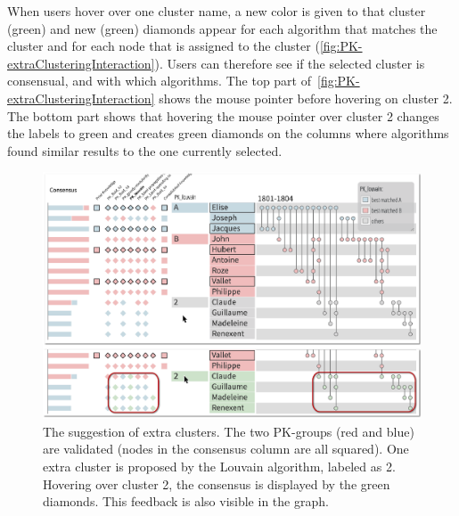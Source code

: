 When users hover over one cluster name, a new color is given to that cluster (\eg green) and new (green) diamonds appear for each algorithm that matches the cluster and for each node that is assigned to the cluster (\autoref{fig:PK-extraClusteringInteraction}).
Users can therefore see if the selected cluster is consensual, and with which algorithms. The top part of~\autoref{fig:PK-extraClusteringInteraction} shows the mouse pointer before hovering on cluster 2. The bottom part shows that hovering the mouse pointer over cluster 2
changes the labels to green and creates green diamonds on the columns where algorithms found similar results to the one currently selected.



\begin{figure}[!ht]
\centering
\includegraphics[width=\linewidth]{static/figures/PK-Clustering/exemple-corrections/Small-extraClusters-01-correct2}
\caption{The suggestion of extra clusters. The two PK-groups (red and blue) are validated (nodes in the consensus column are all squared). One extra cluster is proposed by the Louvain algorithm, labeled as 2. Hovering over cluster 2, the consensus is displayed by the green diamonds. This feedback is also visible in the graph.}
\label{fig:PK-extraClusteringInteraction}
\end{figure}

